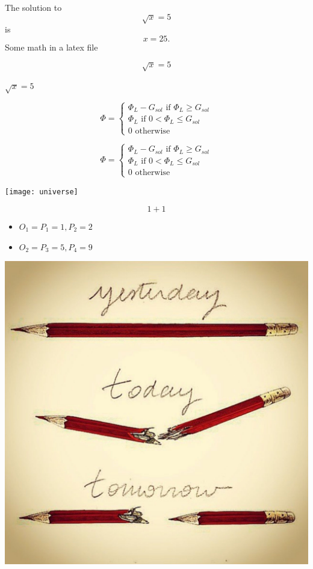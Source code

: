 \documentclass{article}
\begin{document}
The solution to \[\sqrt{x} = 5\] is \[x=25.\]
Some math in a latex file


\[\sqrt{x} = 5\]

\(\sqrt{x} = 5\)

$$
\Phi = \begin{cases}
\Phi_L - G_{sol} \text{ if } \Phi_L \geq G_{sol}\\
\Phi_L \text{ if }  0 <\Phi_L \leq G_{sol}\\
0 \text{ otherwise }
\end{cases}
$$

\begin{equation}
\Phi = \begin{cases}
\Phi_L - G_{sol} \text{ if } \Phi_L \geq G_{sol}\\
\Phi_L \text{ if }  0 <\Phi_L \leq G_{sol}\\
0 \text{ otherwise }
\end{cases}
\end{equation}

\texttt{[image: universe]}

\begin{equation}
  1+1
\end{equation}


\begin{itemize}
\item $O_1 = {P_1 = {1}, P_2 = {2}}$
\item $O_2 = {P_3 = {5}, P_4 = {9}}$
\end{itemize}


\includegraphics{test-image.jpg}
\end{document}
